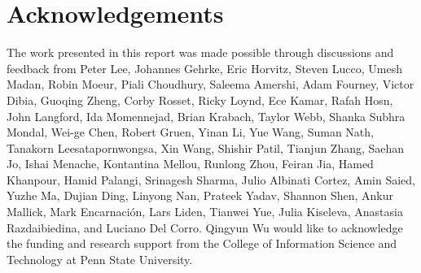 \documentclass{article} %
\begin{document}
\section*{Acknowledgements}
The work presented in this report was made possible through discussions and feedback from Peter Lee, Johannes Gehrke, Eric Horvitz, Steven Lucco, Umesh Madan, Robin Moeur, Piali Choudhury, Saleema Amershi, Adam Fourney, Victor Dibia, Guoqing Zheng, Corby Rosset, Ricky Loynd, Ece Kamar, Rafah Hosn, John Langford, Ida Momennejad, Brian Krabach, Taylor Webb, Shanka Subhra Mondal, Wei-ge Chen, Robert Gruen, Yinan Li, Yue Wang, Suman Nath, Tanakorn Leesatapornwongsa, Xin Wang, Shishir Patil, Tianjun Zhang, Saehan Jo, Ishai Menache, Kontantina Mellou, Runlong Zhou, Feiran Jia, Hamed Khanpour, Hamid Palangi, Srinagesh Sharma, Julio Albinati Cortez, Amin Saied, Yuzhe Ma, Dujian Ding, Linyong Nan, Prateek Yadav, Shannon Shen, Ankur Mallick, Mark Encarnación, Lars Liden, Tianwei Yue, Julia Kiseleva, Anastasia Razdaibiedina, and Luciano Del Corro. Qingyun Wu would like to acknowledge the funding and research support from the College of Information Science and Technology at Penn State University.

\clearpage


\appendix



\end{document}
